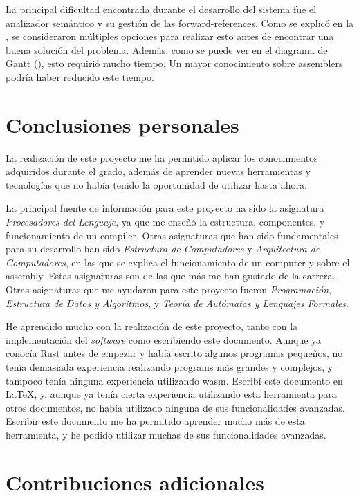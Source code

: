 La principal dificultad encontrada durante el desarrollo del sistema fue el
analizador semántico y su gestión de las \glspl{forward-reference}. Como se
explicó en la , se consideraron múltiples opciones para
realizar esto antes de encontrar una buena solución del problema. Además, como
se puede ver en el diagrama de Gantt (), esto requirió mucho
tiempo. Un mayor conocimiento sobre \glspl{assembler} podría haber reducido este
tiempo.

\section{Conclusiones personales}\label{sec:personal-conclusions}

La realización de este proyecto me ha permitido aplicar los conocimientos
adquiridos durante el grado, además de aprender nuevas herramientas y
tecnologías que no había tenido la oportunidad de utilizar hasta ahora.

La principal fuente de información para este proyecto ha sido la asignatura
\textit{Procesadores del Lenguaje}, ya que me enseñó la estructura, componentes,
y funcionamiento de un \gls{compiler}. Otras asignaturas que han sido
fundamentales para su desarrollo han sido \textit{Estructura de Computadores} y
\textit{Arquitectura de Computadores}, en las que se explica el funcionamiento
de un \gls{computer} y sobre el \gls{assembly}. Estas asignaturas son de las que
más me han gustado de la carrera. Otras asignaturas que me ayudaron para este
proyecto fueron \textit{Programación}, \textit{Estructura de Datos y
Algoritmos}, y \textit{Teoría de Autómatas y Lenguajes Formales}.

He aprendido mucho con la realización de este proyecto, tanto con la
implementación del \textit{software} como escribiendo este documento. Aunque ya
conocía Rust antes de empezar y había escrito algunos programas pequeños, no
tenía demasiada experiencia realizando \glspl{program} más grandes y complejos,
y tampoco tenía ninguna experiencia utilizando \gls{wasm}. Escribí este
documento en \LaTeX, y, aunque ya tenía cierta experiencia utilizando esta
herramienta para otros documentos, no había utilizado ninguna de sus
funcionalidades avanzadas. Escribir este documento me ha permitido aprender
mucho más de esta herramienta, y he podido utilizar muchas de sus
funcionalidades avanzadas.

\section{Contribuciones adicionales}\label{sec:additional-contributions}

